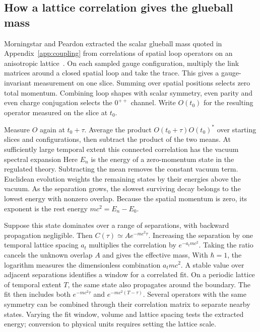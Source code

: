 \subsection{How a lattice correlation gives the glueball mass}
\label{sec:lattice-rest-mass}

Morningstar and Peardon extracted the scalar glueball mass quoted in Appendix~\ref{app:coupling} from correlations of spatial loop operators on an anisotropic lattice~\cite{morningstarPeardon1999}. On each sampled gauge configuration, multiply the link matrices around a closed spatial loop and take the trace. This gives a gauge-invariant measurement on one slice. Summing over spatial positions selects zero total momentum. Combining loop shapes with scalar symmetry, even parity and even charge conjugation selects the \(0^{++}\) channel. Write \(O(t_0)\) for the resulting operator measured on the slice at \(t_0\).

Measure \(O\) again at \(t_0+\tau\). Average the product \(O(t_0+\tau)O(t_0)^*\) over starting slices and configurations, then subtract the product of the two means. At sufficiently large temporal extent this connected correlation has the vacuum spectral expansion
\LatticeGlueballCorrelationDisplay
Here \(E_n\) is the energy of a zero-momentum state in the regulated theory. Subtracting the mean removes the constant vacuum term. Euclidean evolution weights the remaining states by their energies above the vacuum. As the separation grows, the slowest surviving decay belongs to the lowest energy with nonzero overlap. Because the spatial momentum is zero, its exponent is the rest energy \(mc^2=E_n-E_0\).

Suppose this state dominates over a range of separations, with backward propagation negligible. Then \(C(\tau)\simeq A e^{-mc^2\tau}\). Increasing the separation by one temporal lattice spacing \(a_t\) multiplies the correlation by \(e^{-a_tmc^2}\). Taking the ratio cancels the unknown overlap \(A\) and gives the effective mass,
\LatticeGlueballEstimatorDisplay
With \(\hbar=1\), the logarithm measures the dimensionless combination \(a_tmc^2\). A stable value over adjacent separations identifies a window for a correlated fit. On a periodic lattice of temporal extent \(T\), the same state also propagates around the boundary. The fit then includes both \(e^{-mc^2\tau}\) and \(e^{-mc^2(T-\tau)}\). Several operators with the same symmetry can be combined through their correlation matrix to separate nearby states. Varying the fit window, volume and lattice spacing tests the extracted energy; conversion to physical units requires setting the lattice scale.

